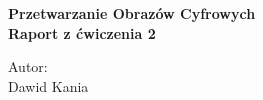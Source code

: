\documentclass{report}
\begin{document}
\begin{titlepage}
    \begin{center}
        \Huge
        \textbf{Przetwarzanie Obrazów Cyfrowych}
        \\ \vspace{1.5cm}
        \Large
        \textbf{Raport z ćwiczenia 2}        
    \end{center}
    \vspace{4.0cm}
    \Large
    Autor: \\
    Dawid Kania    
\end{titlepage}
\end{document}
